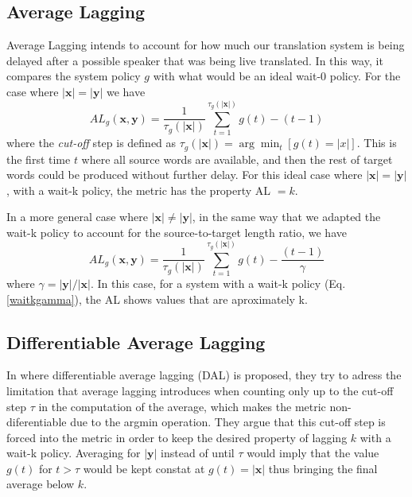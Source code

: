 \documentclass[11pt,english,listoffigures,listoftables]{tfgetsinf}
\newcommand{\vect}[1]{\mathbf{#1}}
\begin{document}
\subsection{Average Lagging}
Average Lagging intends to account for how much our translation system is being delayed after a possible speaker that was being live translated. In this way, it compares the system policy $g$ with what would be an ideal wait-0 policy. For the case where $|\vect{x}|=|\vect{y}|$ we have
\begin{equation}
    AL_g(\vect{x},\vect{y}) = \frac{1}{\tau_g(|\vect{x}|)} \sum_{t=1}^{\tau_g(|\vect{x}|)} g(t) - (t-1)
\end{equation}
where the \textit{cut-off} step is defined as $\tau_g(|\vect{x}|) = \arg \min_t \left[g(t)=|x|\right]$. This is the first time $t$ where all source words are available, and then the rest of target words could be produced without further delay.
For this ideal case where $|\vect{x}|=|\vect{y}|$, with a wait-k policy, the metric has the property AL $ = k$.

In a more general case where $|\vect{x}|\neq|\vect{y}|$, in the same way that we adapted the wait-k policy to account for the source-to-target length ratio, we have 
\begin{equation}\label{al}
    AL_g(\vect{x},\vect{y}) = \frac{1}{\tau_g(|\vect{x}|)} \sum_{t=1}^{\tau_g(|\vect{x}|)} g(t) - \frac{(t-1) }{\gamma}
\end{equation}
where $\gamma = |\vect{y}|/|\vect{x}|$. In this case, for a system with a wait-k policy (Eq. \ref{waitkgamma}), the AL shows values that are aproximately k.

\subsection{Differentiable Average Lagging}
In \cite{DBLP:journals/corr/abs-1906-00048} where differentiable average lagging (DAL) is proposed, they try to adress the limitation that average lagging introduces when counting only up to the cut-off step $\tau$ in the computation of the average, which makes the metric non-diferentiable due to the argmin operation. They argue that this cut-off step is forced into the metric in order to keep the desired property of lagging $k$ with  a wait-k policy. Averaging for $|\vect{y}|$ instead of until $\tau$ would imply that the value $g(t)$ for $t > \tau$ would be kept constat at $g(t) = |\vect{x}|$ thus bringing the final average below $k$.
\end{document}
